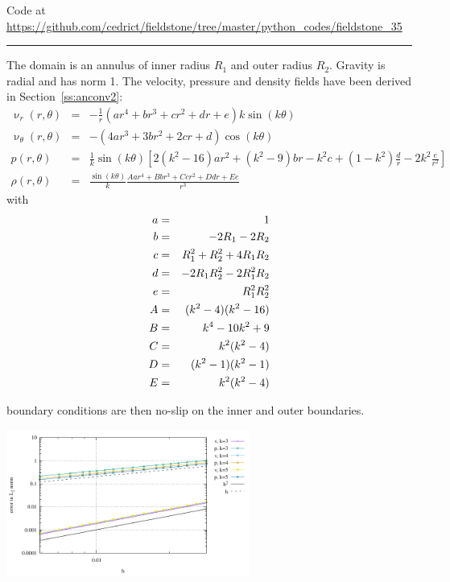

\begin{center}
Code at \url{https://github.com/cedrict/fieldstone/tree/master/python_codes/fieldstone_35}
\end{center}

\par\noindent\rule{\textwidth}{0.4pt}

The domain is an annulus of inner radius $R_1$ and outer radius $R_2$. Gravity is radial 
and has norm 1. 
The velocity, pressure and density fields have been derived in Section~\ref{ss:anconv2}:
\begin{eqnarray}
\upnu_r (r,\theta)&=& -\frac{1}{r} (
{ ar^4}
+{ br^3}
+{c r^2}
+ {dr}
+{e}
)k\sin(k\theta)\\
\upnu_\theta(r,\theta)&=& -(4ar^3+3br^2 +2cr + d ) \cos(k\theta) \\
p(r,\theta) &= &
\frac{1}{k}\sin(k\theta) 
\left[
2(k^2-16)ar^2
+(k^2-9)br
-k^2c
+(1-k^2)\frac{d}{r}
-2k^2\frac{e}{r^2}
\right] \\
\rho(r,\theta)&=&\frac{\sin(k\theta)}{k}
\frac{
A{ ar^4}+
B{ br^3}+
C{c r^2} +
D {dr}+
E{e}
}{r^3}
\end{eqnarray}
with
\begin{eqnarray}
a &=& 1  \nonumber\\
b &=& -2R_1-2R_2 \nonumber\\
c &=& R_1^2+R_2^2+4R_1R_2 \nonumber\\
d &=& -2R_1R_2^2-2R_1^2R_2 \nonumber\\
e &=& R_1^2R_2^2 \nonumber\\
A &=& (k^2-4)(k^2-16)\nonumber \\
B &=& k^4-10k^2+9\nonumber    \\
C &=& k^2(k^2-4)  \nonumber    \\
D &=& (k^2-1)(k^2-1) \nonumber     \\
E &=& k^2(k^2-4) \nonumber
\end{eqnarray}

boundary conditions are then no-slip on the inner and outer boundaries.

\begin{center}
\includegraphics[width=8cm]{python_codes/fieldstone_35/results/errors}
\end{center}

